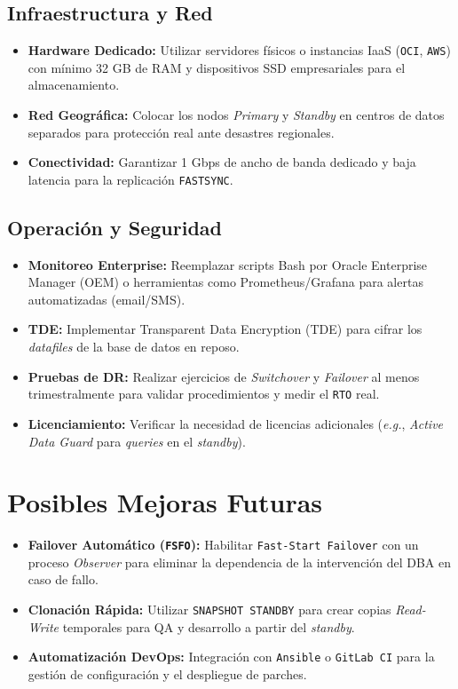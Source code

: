 \documentclass[11pt, a4paper]{report}
\begin{document}
\subsection{Infraestructura y Red}
\begin{itemize}
    \item \textbf{Hardware Dedicado:} Utilizar servidores físicos o instancias IaaS (\texttt{OCI}, \texttt{AWS}) con mínimo 32 GB de RAM y dispositivos SSD empresariales para el almacenamiento.
\item \textbf{Red Geográfica:} Colocar los nodos \textit{Primary} y \textit{Standby} en centros de datos separados para protección real ante desastres regionales.
\item \textbf{Conectividad:} Garantizar 1 Gbps de ancho de banda dedicado y baja latencia para la replicación \texttt{FASTSYNC}.
\end{itemize}

\subsection{Operación y Seguridad}
\begin{itemize}
    \item \textbf{Monitoreo Enterprise:} Reemplazar scripts Bash por Oracle Enterprise Manager (OEM) o herramientas como Prometheus/Grafana para alertas automatizadas (email/SMS).
\item \textbf{TDE:} Implementar Transparent Data Encryption (TDE) para cifrar los \textit{datafiles} de la base de datos en reposo.
\item \textbf{Pruebas de DR:} Realizar ejercicios de \textit{Switchover} y \textit{Failover} al menos trimestralmente para validar procedimientos y medir el \texttt{RTO} real.
\item \textbf{Licenciamiento:} Verificar la necesidad de licencias adicionales (\textit{e.g.}, \textit{Active Data Guard} para \textit{queries} en el \textit{standby}).
\end{itemize}

\section{Posibles Mejoras Futuras}

\begin{itemize}
    \item \textbf{Failover Automático (\texttt{FSFO}):} Habilitar \texttt{Fast-Start Failover} con un proceso \textit{Observer} para eliminar la dependencia de la intervención del DBA en caso de fallo.
\item \textbf{Clonación Rápida:} Utilizar \texttt{SNAPSHOT STANDBY} para crear copias \textit{Read-Write} temporales para QA y desarrollo a partir del \textit{standby}.
\item \textbf{Automatización DevOps:} Integración con \texttt{Ansible} o \texttt{GitLab CI} para la gestión de configuración y el despliegue de parches.
\end{itemize}
\end{document}
